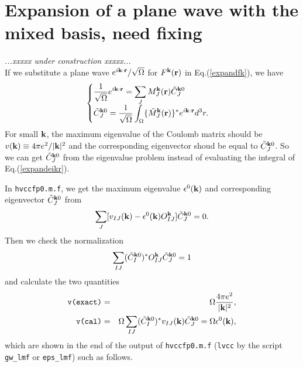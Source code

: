 \documentclass[a4paper,10pt,epsf,fleqn]{article}
\def\underconstruction{{\it...xxxxx under construction xxxxx...\\}}
\begin{document}
\section{Expansion of a plane wave with the mixed basis, need fixing}
\underconstruction
If we substitute a plane wave
$e^{i{\bf k \cdot r}}/\sqrt{\Omega}$ 
for $F^{\bf k}(\bf r)$ in Eq.(\ref{expandfk}),
we have
\begin{eqnarray}
\begin{cases}
  \displaystyle 
  \frac{1}{\sqrt{\Omega}}e^{i{\bf k \cdot r}} 
  = \sum_J M_J^{\bf k} ({\bf r}) \tilde{C}^{{\bf k}0}_J & \cr
  \displaystyle
  \tilde{C}^{{\bf k}0}_J = 
  \frac{1}{\sqrt{\Omega}}
  \int_\Omega \{\tilde{M}_J^{\bf k}({\bf r})\}^* 
  e^{i{\bf k \cdot r}} d^3r.
\end{cases}
  \label{expandeikr}
\end{eqnarray}
For small ${\bf k}$, the maximum eigenvalue of the
Coulomb matrix should be $v({\bf k}) \equiv 4\pi e^2/|{\bf k}|^2$
and the corresponding eigenvector shoud be equal to $\tilde{C}^{{\bf k}0}_J$.
So we can get $\tilde{C}^{{\bf k}0}_J$ from the eigenvalue problem
instead of evaluating the integral of Eq.(\ref{expandeikr}).

In \verb|hvccfp0.m.f|, we get the maximum eigenvalue $\epsilon^0({\bf k})$ 
and corresponding eigenvector $\tilde{C}^{{\bf k}0}_J$ from 
\begin{eqnarray}
   \sum_J[v_{IJ}({\bf k}) - \epsilon^0({\bf k})
   O^{\bf k}_{IJ}] \tilde{C}^{{\bf k}0}_J=0.
\end{eqnarray}
Then we check the normalization
\begin{eqnarray}
  \sum_{IJ}( \tilde{C}^{{\bf k}0}_I )^* O_{IJ}^{\bf k}
              \tilde{C}^{{\bf k}0}_J = 1
\end{eqnarray}
and calculate the two quantities
\begin{eqnarray} 
   \verb|v(exact)|
    &=& \Omega \frac{4\pi e^2}{|{\bf k}|^2}, \\
   \verb|v(cal)| 
    &=& \Omega \sum_{IJ}( \tilde{C}^{{\bf k}0}_I )^*v_{IJ}({\bf k}) 
              \tilde{C}^{{\bf k}0}_J
     =  \Omega \epsilon^0({\bf k}),
\end{eqnarray}
which are shown in the end of the output of \verb|hvccfp0.m.f| 
(\verb|lvcc| by the script \verb|gw_lmf| or \verb|eps_lmf|) such as follows.
\end{document}
